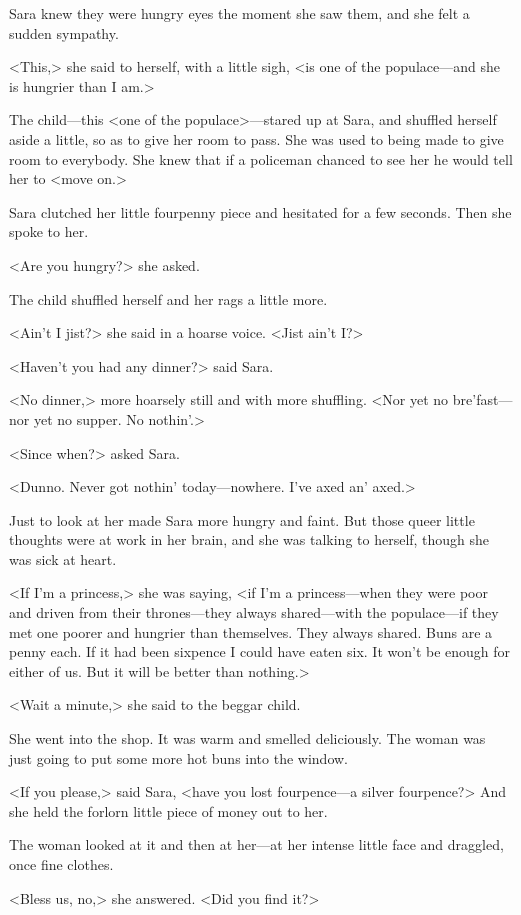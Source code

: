 Sara knew they were hungry eyes the moment she saw them, and she felt a sudden sympathy.

<This,> she said to herself, with a little sigh, <is one of the populace—and she is hungrier than I am.>

The child—this <one of the populace>—stared up at Sara, and shuffled herself aside a little, so as to give her room to pass. She was used to being made to give room to everybody. She knew that if a policeman chanced to see her he would tell her to <move on.>

Sara clutched her little fourpenny piece and hesitated for a few seconds. Then she spoke to her.

<Are you hungry?> she asked.

The child shuffled herself and her rags a little more.

<Ain't I jist?> she said in a hoarse voice. <Jist ain't I\@?>

<Haven't you had any dinner?> said Sara.

<No dinner,> more hoarsely still and with more shuffling. <Nor yet no bre'fast—nor yet no supper. No nothin'.>

<Since when?> asked Sara.

<Dunno. Never got nothin' today—nowhere. I've axed an' axed.>

Just to look at her made Sara more hungry and faint. But those queer little thoughts were at work in her brain, and she was talking to herself, though she was sick at heart.

<If I'm a princess,> she was saying, <if I'm a princess—when they were poor and driven from their thrones—they always shared—with the populace—if they met one poorer and hungrier than themselves. They always shared. Buns are a penny each. If it had been sixpence I could have eaten six. It won't be enough for either of us. But it will be better than nothing.>

<Wait a minute,> she said to the beggar child.

She went into the shop. It was warm and smelled deliciously. The woman was just going to put some more hot buns into the window.

<If you please,> said Sara, <have you lost fourpence—a silver fourpence?> And she held the forlorn little piece of money out to her.

The woman looked at it and then at her—at her intense little face and draggled, once fine clothes.

<Bless us, no,> she answered. <Did you find it?>

